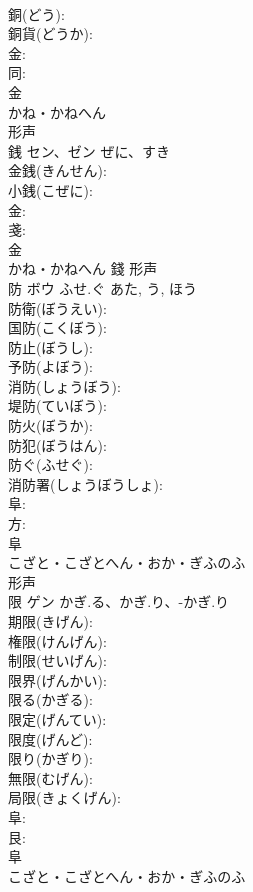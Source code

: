 \documentclass[8pt]{extreport}
\begin{document}
\begin{CJK}{UTF8}{min}
\\	銅(どう): 
\\	銅貨(どうか): 
\\	金: 
\\	同: 
\\	金	
\\	かね・かねへん	
\\	形声 
\\	銭	セン、ゼン	ぜに、すき		
\\	金銭(きんせん): 
\\	小銭(こぜに): 
\\	金: 
\\	戔: 
\\	金	
\\	かね・かねへん	錢	形声 
\\	防	ボウ	ふせ.ぐ	あた, う, ほう	
\\	防衛(ぼうえい): 
\\	国防(こくぼう): 
\\	防止(ぼうし): 
\\	予防(よぼう): 
\\	消防(しょうぼう): 
\\	堤防(ていぼう): 
\\	防火(ぼうか): 
\\	防犯(ぼうはん): 
\\	防ぐ(ふせぐ): 
\\	消防署(しょうぼうしょ): 
\\	阜: 
\\	方: 
\\	阜	
\\	こざと・こざとへん・おか・ぎふのふ	
\\	形声 
\\	限	ゲン	かぎ.る、かぎ.り、-かぎ.り		
\\	期限(きげん): 
\\	権限(けんげん): 
\\	制限(せいげん): 
\\	限界(げんかい): 
\\	限る(かぎる): 
\\	限定(げんてい): 
\\	限度(げんど): 
\\	限り(かぎり): 
\\	無限(むげん): 
\\	局限(きょくげん): 
\\	阜: 
\\	艮: 
\\	阜	
\\	こざと・こざとへん・おか・ぎふのふ	

\end{CJK}
\end{document}
